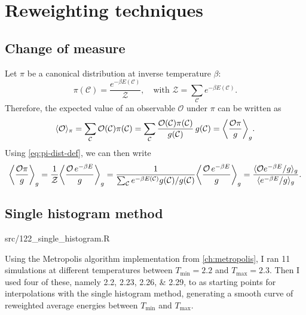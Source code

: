 \chapter{Reweighting techniques}

\section{Change of measure}

Let $\pi$ be a canonical distribution at inverse temperature $\beta$:
\begin{equation}
  \pi(\mathcal{C}) = \frac{e^{-\beta E(\mathcal{C})}}{\mathcal{Z}},
  \quad \text{with } \mathcal{Z} = \sum_{\mathcal{C}} e^{-\beta E(\mathcal{C})}.
  \label{eq:pi-dist-def}
\end{equation}
Therefore, the expected value of an observable $\mathcal{O}$ under $\pi$ can be
written as
\begin{equation}
  \expval{\mathcal{O}}_{\pi}
  = \sum_{\mathcal{C}} \mathcal{O}(\mathcal{C}) \pi(\mathcal{C})
  = \sum_{\mathcal{C}} \frac{\mathcal{O}(\mathcal{C})
  \pi(\mathcal{C})}{g(\mathcal{C})} \, g(\mathcal{C}) =
  \expval*{\frac{\mathcal{O} \pi}{g}}_{g}.
\end{equation}
Using \cref{eq:pi-dist-def}, we can then write
\begin{equation}
  \expval*{\frac{\mathcal{O} \pi}{g}}_{g}
  = \frac{1}{\mathcal{Z}} \expval*{\frac{\mathcal{O}\, e^{-\beta E}}{g}}_{g}
  = \frac{1}{\sum_{\mathcal{C}} e^{-\beta E(\mathcal{C})} g(\mathcal{C}) /
  g(\mathcal{C})} \expval*{\frac{\mathcal{O} \, e^{-\beta E}}{g}}_{g}
  = \frac{\expval{\mathcal{O} e^{-\beta E} / g}_{g}}{%
    \expval{e^{-\beta E} / g}_{g}}.
\end{equation}

\section{Single histogram method}\label{ex:122}

\begin{sourcefiles}
  \item[Analysis script] src/122\_single\_histogram.R
\end{sourcefiles}

Using the Metropolis algorithm implementation from \cref{ch:metropolis}, I ran
\num{11} simulations at different temperatures between $T_{\mathrm{min}} =
\num{2.2}$ and $T_{\mathrm{max}} = \num{2.3}$. Then I used four of these, namely
\numlist{2.2;2.23;2.26;2.29}, to as starting points for interpolations with the
single histogram method, generating a smooth curve of reweighted average
energies between $T_{\mathrm{min}}$ and $T_{\mathrm{max}}$.

